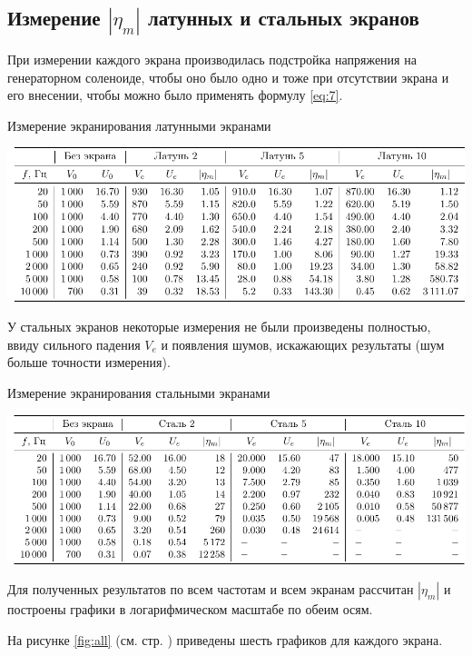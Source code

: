 \subsection{Измерение $|\eta_m|$ латунных и стальных экранов}

При измерении каждого экрана производилась подстройка напряжения на генераторном соленоиде, чтобы оно было одно и тоже при отсутствии экрана и его внесении, чтобы можно было применять формулу \eqref{eq:7}.

\begin{table}[h!]
	\caption{Измерение экранирования латунными экранами}
	\label{tab:6s1}
	\vspace{1em}
	\centering
	\includegraphics[width=\textwidth]{tables/table1}
\end{table}

У стальных экранов некоторые измерения не были произведены полностью, ввиду сильного падения $V_e$ и появления шумов, искажающих результаты (шум больше точности измерения).

\begin{table}[h!]
	\caption{Измерение экранирования стальными экранами}
	\label{tab:6s1}
	\vspace{1em}
	\centering
	\includegraphics[width=\textwidth]{tables/table2}
\end{table}

Для полученных результатов по всем частотам и всем экранам рассчитан $|\eta_m|$ и построены графики в логарифмическом масштабе по обеим осям.

На рисунке \ref{fig:all} (см. стр. \pageref{fig:all}) приведены шесть графиков для каждого экрана. 


